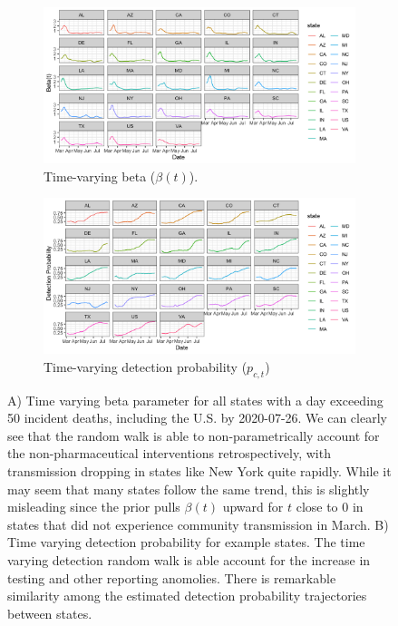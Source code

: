 \documentclass[11pt]{amsart}
\begin{document}
\begin{figure}
  \centering
     \begin{subfigure}{1\textwidth}
  \centering
    \includegraphics[scale=.2]{beta_t_plot.png}
    \caption{Time-varying beta ($\beta(t)$).}
\end{subfigure}

\begin{subfigure}{1\textwidth}
  \centering
    \includegraphics[scale=.2]{detection_plot.png}
    \caption{Time-varying detection probability ($p_{c,t}$)}
\end{subfigure} 
 \caption{  A) Time varying beta parameter for all states with a day exceeding 50 incident deaths, including the U.S. by 2020-07-26. We can clearly see that the random walk is able to non-parametrically account for the non-pharmaceutical interventions retrospectively, with transmission dropping in states like New York quite rapidly. While it may seem that many states follow the same trend, this is slightly misleading since the prior pulls $\beta(t)$ upward for $t$ close to 0 in states that did not experience community transmission in March.  B) Time varying detection probability for example states. The time varying detection random walk is able account for the increase in testing and other reporting anomolies. There is remarkable similarity among the estimated detection probability trajectories between states.}
\label{fig:model_details}
\end{figure}
\end{document}
